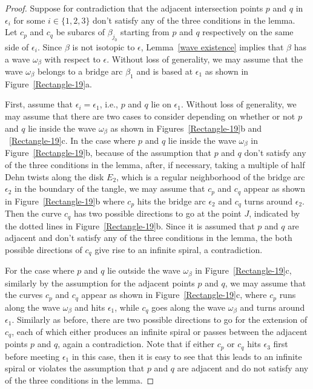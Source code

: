 \documentclass[12pt]{amsart}
\newcommand{\be}{\beta}
\newcommand{\ep}{\epsilon}
\begin{document}
\begin{proof}
Suppose for contradiction that the adjacent intersection points $p$ and $q$ in $\ep_{i}$ for some $i\in\{1, 2, 3\}$ don't satisfy any of the three conditions in the lemma. Let $c_p$ and $c_q$ be subarcs of $\be_{j_0}$ starting from $p$ and $q$ respectively on the same side of $\ep_i$.
Since $\be$ is not isotopic to $\ep$, Lemma~\ref{wave existence} implies that $\be$ has a wave $\omega_{\be}$ with respect to $\ep$. Without loss of generality, we may assume that the wave $\omega_\be$ belongs to a bridge arc $\be_1$ and is based at $\ep_1$ as shown in Figure~\ref{Rectangle-19}a.

First, assume that $\ep_i=\ep_1$, i.e., $p$ and $q$ lie on $\ep_1$. Without loss of generality, we may assume that there are two cases to consider depending on whether or not $p$ and $q$ lie inside the wave $\omega_\be$ as shown in Figures~\ref{Rectangle-19}b and ~\ref{Rectangle-19}c.
In the case where $p$ and $q$ lie inside the wave $\omega_\be$ in Figure~\ref{Rectangle-19}b, because of the assumption that $p$ and $q$ don't satisfy any of the three conditions in the lemma, after, if necessary, taking a multiple of half Dehn twists along the disk $E_2$, which is a regular neighborhood of the bridge arc $\ep_2$ in the boundary of the tangle, we may assume that $c_p$ and $c_q$ appear as shown in Figure~\ref{Rectangle-19}b where $c_p$ hits the bridge arc $\ep_2$ and $c_q$ turns around $\ep_2$. Then the curve $c_q$ has two possible directions to go at the point $J$, indicated by the dotted lines in Figure~\ref{Rectangle-19}b. Since it is assumed that $p$ and $q$ are adjacent and don't satisfy any of the three conditions in the lemma, the both possible directions of $c_q$ give rise to an infinite spiral, a contradiction.

For the case where $p$ and $q$ lie outside the wave $\omega_\be$ in Figure~\ref{Rectangle-19}c, similarly by the assumption for the adjacent points $p$ and $q$, we may assume that the curves $c_p$ and $c_q$ appear as shown in Figure~\ref{Rectangle-19}c, where $c_p$ runs along the wave $\omega_\be$ and hits $\ep_1$, while $c_q$ goes along the wave $\omega_\be$ and turns around $\ep_1$. Similarly as before, there are two possible directions to go for the extension of $c_q$, each of which either produces an infinite spiral or passes between the adjacent points $p$ and $q$, again a contradiction. Note that if either $c_p$ or $c_q$ hits $\ep_3$ first before meeting $\ep_1$ in this case, then it is easy to see that this leads to an infinite spiral or violates the assumption that $p$ and $q$ are adjacent and do not satisfy any of the three conditions in the lemma.



\end{proof}
\end{document}
